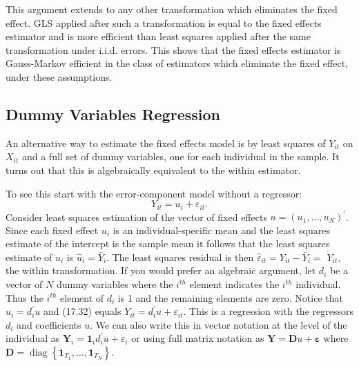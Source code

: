 \documentclass[10pt]{article}
\begin{document}
This argument extends to any other transformation which eliminates the fixed effect. GLS applied after such a transformation is equal to the fixed effects estimator and is more efficient than least squares applied after the same transformation under i.i.d. errors. This shows that the fixed effects estimator is Gauss-Markov efficient in the class of estimators which eliminate the fixed effect, under these assumptions.

\subsection{Dummy Variables Regression}
An alternative way to estimate the fixed effects model is by least squares of $Y_{i t}$ on $X_{i t}$ and a full set of dummy variables, one for each individual in the sample. It turns out that this is algebraically equivalent to the within estimator.

To see this start with the error-component model without a regressor:
$$
Y_{i t}=u_{i}+\varepsilon_{i t} .
$$
Consider least squares estimation of the vector of fixed effects $u=\left(u_{1}, \ldots, u_{N}\right)^{\prime}$. Since each fixed effect $u_{i}$ is an individual-specific mean and the least squares estimate of the intercept is the sample mean it follows that the least squares estimate of $u_{i}$ is $\widehat{u}_{i}=\bar{Y}_{i}$. The least squares residual is then $\widehat{\varepsilon}_{i t}=Y_{i t}-\bar{Y}_{i}=$ $\dot{Y}_{i t}$, the within transformation. If you would prefer an algebraic argument, let $d_{i}$ be a vector of $N$ dummy variables where the $i^{t h}$ element indicates the $i^{t h}$ individual. Thus the $i^{t h}$ element of $d_{i}$ is 1 and the remaining elements are zero. Notice that $u_{i}=d_{i}^{\prime} u$ and (17.32) equals $Y_{i t}=d_{i}^{\prime} u+\varepsilon_{i t}$. This is a regression with the regressors $d_{i}$ and coefficients $u$. We can also write this in vector notation at the level of the individual as $\boldsymbol{Y}_{i}=\mathbf{1}_{i} d_{i}^{\prime} u+\varepsilon_{i}$ or using full matrix notation as $\boldsymbol{Y}=\boldsymbol{D} u+\boldsymbol{\varepsilon}$ where $\boldsymbol{D}=\operatorname{diag}\left\{\mathbf{1}_{T_{1}}, \ldots, \mathbf{1}_{T_{N}}\right\}$.
\end{document}
